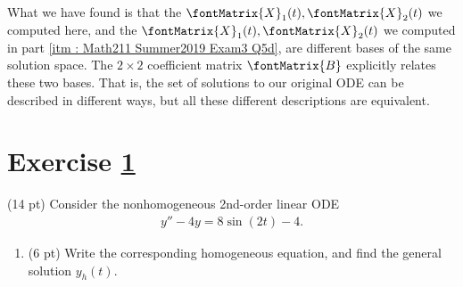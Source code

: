 \begin{remark}
What we have found is that the $\fontMatrix{X}_{1}(t),\fontMatrix{X}_{2}(t)$ we computed here, and the $\fontMatrix{X}_{1}(t),\fontMatrix{X}_{2}(t)$ we computed in part \ref{itm : Math211 Summer2019 Exam3 Q5d}, are different bases of the same solution space. The $2 \times 2$ coefficient matrix $\fontMatrix{B}$ explicitly relates these two bases. That is, the set of solutions to our original ODE can be described in different ways, but all these different descriptions are equivalent.
\end{remark}





%
%
%
%


\section{Exercise \ref{sec : Math211 Summer2019 Exam3 Q6}}
\label{sec : Math211 Summer2019 Exam3 Q6}

(14 pt) Consider the nonhomogeneous 2nd-order linear ODE
\begin{align}
y'' - 4 y
=
8 \sin(2 t) - 4.%
\label{eq : Math211 Summer2019 Exam3 Q6 ODE}
\end{align}



\begin{enumerate}[label=(\alph*)]
\item\label{itm : Math211 Summer2019 Exam3 Q6a} (6 pt) Write the corresponding homogeneous equation, and find the general solution $y_{h}(t)$.
\end{enumerate}

